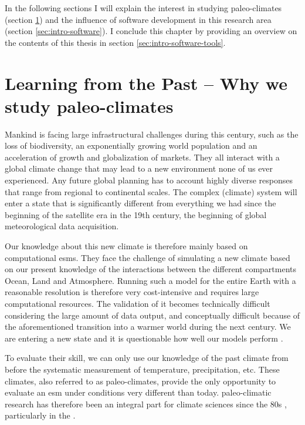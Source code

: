 \begin{refsection}
In the following sections I will explain the interest in studying paleo-climates (section \ref{sec:intro-paleo}) and the influence of software development in this research area (section \ref{sec:intro-software}). I conclude this chapter by providing an overview on the contents of this thesis in section \ref{sec:intro-software-tools}.

\section{Learning from the Past – Why we study paleo-climates} \label{sec:intro-paleo}

Mankind is facing large infrastructural challenges during this century, such as the loss of biodiversity\addref, an exponentially growing world population \addref and an acceleration of growth and globalization of markets. They all interact with a global climate change that may lead to a new environment none of us ever experienced. Any future global planning has to account highly diverse responses that range from regional to continental scales. The complex (climate) system will enter a state that is significantly different from everything we had since the beginning of the satellite era in the 19th century, the beginning of global meteorological data acquisition\addref.

Our knowledge about this new climate is therefore mainly based on computational \glspl{esm}. They face the challenge of simulating a new climate based on our present knowledge of the interactions between the different compartments Ocean, Land and Atmosphere. Running such a model for the entire Earth with a reasonable resolution is therefore very cost-intensive and requires large computational resources. The validation of it becomes technically difficult considering the large amount of data output, and conceptually difficult because of the aforementioned transition into a warmer world during the next century. We are entering a new state and it is questionable how well our models perform \citep{UldenOldenborgh2006, Karpechko2010, HargreavesAnnanOhgaitoEtAl2013}.

To evaluate their skill, we can only use our knowledge of the past climate from before the systematic measurement of temperature, precipitation, etc. These climates, also referred to as paleo-climates, provide the only opportunity to evaluate an \gls{esm} under conditions very different than today. paleo-climatic research has therefore been an integral part for climate sciences since the 80s \citep{COHMAPMembers1988, JoussaumeTaylor1995}, particularly in the  \citep{BraconnotOttoBliesnerHarrisonEtAl2007, BraconnotOttoBliesnerHarrisonEtAl2007a, BraconnotHarrisonKageyamaEtAl2012, KageyamaBraconnotHarrisonEtAl2016, Otto-BliesnerBraconnotHarrisonEtAl2017, JungclausBardBaroniEtAl2017}.


\end{refsection}
